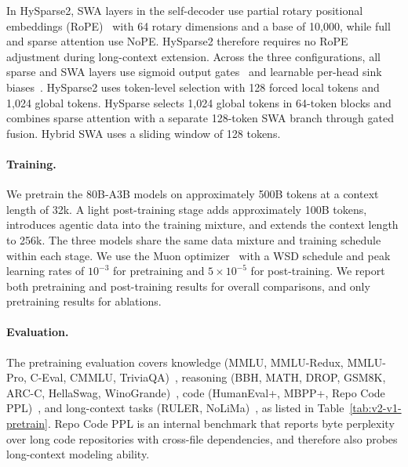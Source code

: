 In HySparse2, SWA layers in the self-decoder use partial rotary positional embeddings (RoPE)~\citep{rope} with 64 rotary dimensions and a base of 10,000, while full and sparse attention use NoPE.
HySparse2 therefore requires no RoPE adjustment during long-context extension.
Across the three configurations, all sparse and SWA layers use sigmoid output gates~\citep{qiu2025gated} and learnable per-head sink biases~\citep{gpt-oss}.
HySparse2 uses token-level selection with 128 forced local tokens and 1,024 global tokens.
HySparse selects 1,024 global tokens in 64-token blocks and combines sparse attention with a separate 128-token SWA branch through gated fusion.
Hybrid SWA uses a sliding window of 128 tokens.

\paragraph{Training.}
We pretrain the 80B-A3B models on approximately 500B tokens at a context length of 32k.
A light post-training stage adds approximately 100B tokens, introduces agentic data into the training mixture, and extends the context length to 256k.
The three models share the same data mixture and training schedule within each stage.
We use the Muon optimizer~\citep{jordan2024muon} with a WSD schedule and peak learning rates of $10^{-3}$ for pretraining and $5\times10^{-5}$ for post-training.
We report both pretraining and post-training results for overall comparisons, and only pretraining results for ablations.

\paragraph{Evaluation.}



The pretraining evaluation covers knowledge (MMLU, MMLU-Redux, MMLU-Pro, C-Eval, CMMLU, TriviaQA)~\citep{mmlu,gema2024we,wang2024mmlu,huang2023c,li2023cmmlu,joshi2017triviaqa}, reasoning (BBH, MATH, DROP, GSM8K, ARC-C, HellaSwag, WinoGrande)~\citep{suzgun2022challenging,hendrycks2021measuring,dua2019drop,gsm8k,arcc,zellers2019hellaswag,sakaguchi2021winogrande}, code (HumanEval+, MBPP+, Repo Code PPL)~\citep{humaneval,mbpp,liu2023your}, and long-context tasks (RULER, NoLiMa)~\citep{ruler,modarressi2025nolima}, as listed in Table~\ref{tab:v2-v1-pretrain}.
Repo Code PPL is an internal benchmark that reports byte perplexity over long code repositories with cross-file dependencies, and therefore also probes long-context modeling ability.

